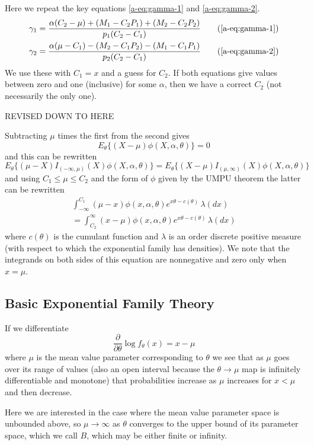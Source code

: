 \documentclass[11pt]{article}
\newcommand{\REVISED}{\begin{center} \LARGE REVISED DOWN TO HERE \end{center}}
\begin{document}
Here we repeat the key equations
\eqref{a-eq:gamma-1} and \eqref{a-eq:gamma-2}.
\begin{align}
   \gamma_1
   & =
   \frac{\alpha (C_2 - \mu) + (M_1 - C_2 P_1) + (M_2 - C_2 P_2)}
   {p_1 (C_2 - C_1)}
   \tag{\ref{a-eq:gamma-1}}
   \\
   \gamma_2
   & =
   \frac{\alpha (\mu - C_1) - (M_2 - C_1 P_2) - (M_1 - C_1 P_1)}
   {p_2 (C_2 - C_1)}
   \tag{\ref{a-eq:gamma-2}}
\end{align}
We use these with $C_1 = x$ and a guess for $C_2$.  If both equations
give values between zero and one (inclusive) for some $\alpha$,
then we have a correct $C_2$ (not necessarily the only one).


\REVISED

Subtracting $\mu$ times the first from the second gives
$$
   E_\theta\{ (X - \mu) \phi(X, \alpha, \theta) \} = 0
$$
and this can be rewritten
$$
   E_\theta\{ (\mu - X) I_{(- \infty, \mu)}(X) \phi(X, \alpha, \theta) \}
   =
   E_\theta\{ (X - \mu) I_{(\mu, \infty)}(X) \phi(X, \alpha, \theta) \}
$$
and using $C_1 \le \mu \le C_2$ and the form of $\phi$ given
by the UMPU theorem the latter can be rewritten
\begin{multline*}
   \int_{- \infty}^{C_1} (\mu - x) \phi(x, \alpha, \theta)
   e^{x \theta - c(\theta)} \, \lambda(d x)
   \\
   =
   \int_{C_2}^\infty (x - \mu) \phi(x, \alpha, \theta)
   e^{x \theta - c(\theta)} \, \lambda(d x)
\end{multline*}
where $c(\theta)$ is the cumulant function and $\lambda$ is an order
discrete positive measure (with respect to which the exponential family
has densities).  We note that the integrands on both sides of this
equation are nonnegative and zero only when $x = \mu$.

\subsection{Basic Exponential Family Theory}

If we differentiate
$$
   \frac{\partial}{\partial \theta} \log f_\theta(x) = x - \mu
$$
where $\mu$ is the mean value parameter corresponding to $\theta$
we see that as $\mu$ goes over its range of values (also an open interval
because the $\theta \to \mu$ map is infinitely differentiable and monotone)
that probabilities increase as $\mu$ increases for $x < \mu$ and then decrease.

Here we are interested in the case where the mean value parameter space is
unbounded above, so $\mu \to \infty$ as $\theta$ converges to the upper
bound of its parameter space, which we call $B$, which may be either finite
or infinity.
\end{document}
